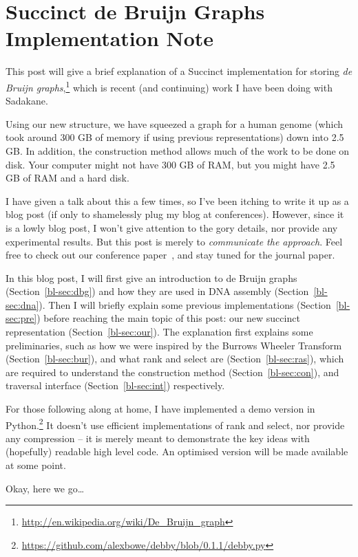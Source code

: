 \chapter{Succinct de Bruijn Graphs Implementation Note}

This post will give a brief explanation of a Succinct implementation for storing \emph{de Bruijn graphs},\footnote{\url{http://en.wikipedia.org/wiki/De_Bruijn_graph}} which is recent (and continuing) work I have been doing with Sadakane.

Using our new structure, we have squeezed a graph for a human genome (which took around 300 GB of memory if using previous representations) down into 2.5 GB. In addition, the construction method allows much of the work to be done on disk. Your computer might not have 300 GB of RAM, but you might have 2.5 GB of RAM and a hard disk.

I have given a talk about this a few times, so I've been itching to write it up as a blog post (if only to shamelessly plug my blog at conferences). However, since it is a lowly blog post, I won't give attention to the gory details, nor provide any experimental results. But this post is merely to \emph{communicate the approach}. Feel free to check out our conference paper~\cite{BOSS12}, and stay tuned for the journal paper.

In this blog post, I will first give an introduction to de Bruijn graphs (Section~\ref{bl-sec:dbg}) and how they are used in DNA assembly (Section~\ref{bl-sec:dna}). Then I will briefly explain some previous implementations (Section~\ref{bl-sec:pre}) before reaching the main topic of this post: our new succinct representation (Section~\ref{bl-sec:our}). The explanation first explains some preliminaries, such as how we were inspired by the Burrows Wheeler Transform (Section~\ref{bl-sec:bur}), and what rank and select are (Section~\ref{bl-sec:ras}), which are required to understand the construction method (Section~\ref{bl-sec:con}), and traversal interface (Section~\ref{bl-sec:int}) respectively.

For those following along at home, I have implemented a demo version in Python.\footnote{\url{https://github.com/alexbowe/debby/blob/0.1.1/debby.py}} It doesn't use efficient implementations of rank and select, nor provide any compression -- it is merely meant to demonstrate the key ideas with (hopefully) readable high level code. An optimised version will be made available at some point.

Okay, here we go\ldots

